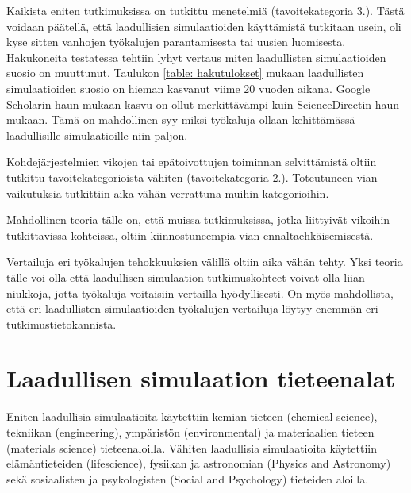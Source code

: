 \documentclass[utf8]{gradu3}
\begin{document}
Kaikista eniten tutkimuksissa on tutkittu menetelmiä (tavoitekategoria 3.).
Tästä voidaan päätellä, että laadullisien simulaatioiden käyttämistä 
tutkitaan usein, oli kyse sitten vanhojen työkalujen parantamisesta tai 
uusien luomisesta. 
Hakukoneita testatessa tehtiin lyhyt vertaus miten laadullisten simulaatioiden suosio on 
muuttunut. Taulukon \ref{table: hakutulokset} mukaan laadullisten simulaatioiden 
suosio on hieman kasvanut viime 20 vuoden aikana. Google Scholarin haun mukaan kasvu on ollut
merkittävämpi kuin ScienceDirectin haun mukaan.
Tämä on mahdollinen syy miksi työkaluja ollaan kehittämässä laadullisille simulaatioille
niin paljon.

Kohdejärjestelmien vikojen tai epätoivottujen toiminnan selvittämistä 
oltiin tutkittu tavoitekategorioista vähiten (tavoitekategoria 2.).
Toteutuneen vian vaikutuksia tutkittiin aika vähän 
verrattuna muihin kategorioihin. 

Mahdollinen teoria tälle on, että muissa tutkimuksissa, 
jotka liittyivät vikoihin tutkittavissa kohteissa, 
oltiin kiinnostuneempia vian ennaltaehkäisemisestä.

Vertailuja eri työkalujen tehokkuuksien välillä oltiin aika vähän tehty. 
Yksi teoria tälle voi  olla että laadullisen simulaation tutkimuskohteet 
voivat olla liian niukkoja, jotta työkaluja voitaisiin vertailla hyödyllisesti.
On myös mahdollista, että eri laadullisten simulaatioiden työkalujen vertailuja 
löytyy enemmän eri tutkimustietokannista.

\section{Laadullisen simulaation tieteenalat}

Eniten laadullisia simulaatioita käytettiin kemian tieteen (chemical science),
tekniikan (engineering), ympäristön (environmental) ja materiaalien tieteen  (materials science) tieteenaloilla. 
Vähiten laadullisia simulaatioita käytettiin elämäntieteiden (lifescience),
fysiikan ja astronomian  (Physics and Astronomy) sekä 
sosiaalisten ja psykologisten (Social and Psychology) tieteiden aloilla.
\end{document}
